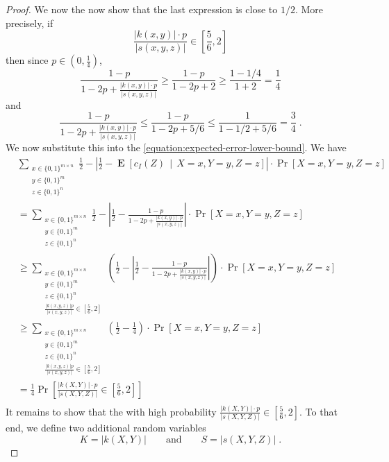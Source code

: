 \documentclass[10pt]{article}
\DeclareMathOperator{\Exp}{\mathbf{E}}
\begin{document}
\begin{proof}
We now the now show that the last expression is close to $1/2$. More precisely, if
\begin{equation}
\frac{|k(x,y)| \cdot p}{|s(x,y,z)|} \in \left[\frac{5}{6}, 2 \right]
\end{equation}
then since $p \in (0,\frac{1}{4})$,
$$
\frac{\displaystyle 1 - p}{\displaystyle 1 - 2p + \frac{|k(x,y)| \cdot p}{|s(x,y,z)|}} \ge
\frac{\displaystyle 1 - p}{\displaystyle 1 - 2p + 2} \ge \frac{\displaystyle 1 - 1/4}{\displaystyle 1 + 2} = \frac{1}{4}
$$
and
$$
\frac{\displaystyle 1 - p}{\displaystyle 1 - 2p + \frac{|k(x,y)| \cdot p}{|s(x,y,z)|}} \le
\frac{\displaystyle 1 - p}{\displaystyle 1 - 2p + 5/6} \le \frac{\displaystyle 1}{\displaystyle 1 - 1/2 + 5/6} = \frac{3}{4} \; .
$$
We now substitute this into the \eqref{equation:expected-error-lower-bound}. We have
\begin{align*}
& \sum_{\substack{x \in \{0,1\}^{m \times n} \\ y \in \{0,1\}^m \\ z \in \{0,1\}^n}} \frac{1}{2} - \left| \frac{1}{2} - \Exp\left[ c_I(Z) \, \middle| \, X = x, Y = y, Z = z \right] \right| \cdot \Pr \left[X = x, Y = y, Z = z \right] \\
& = \sum_{\substack{x \in \{0,1\}^{m \times n} \\ y \in \{0,1\}^m \\ z \in \{0,1\}^n}} \frac{1}{2} - \left| \frac{1}{2} - \frac{\displaystyle 1 - p}{\displaystyle 1 - 2p + \frac{|k(x,y)| \cdot p}{|s(x,y,z)|}} \right| \cdot \Pr \left[X = x, Y = y, Z = z \right] \\
& \ge
\sum_{\substack{x \in \{0,1\}^{m \times n} \\ y \in \{0,1\}^m \\ z \in \{0,1\}^n \\ \frac{|k(x,y,z)| p}{|s(x,y,z)|} \in [\frac{5}{6},2]}} \left( \frac{1}{2} - \left| \frac{1}{2} - \frac{\displaystyle 1 - p}{\displaystyle 1 - 2p + \frac{|k(x,y)| \cdot p}{|s(x,y,z)|}} \right|  \right) \cdot \Pr \left[X = x, Y = y, Z = z \right] \\
& \ge
\sum_{\substack{x \in \{0,1\}^{m \times n} \\ y \in \{0,1\}^m \\ z \in \{0,1\}^n \\ \frac{|k(x,y,z)| p}{|s(x,y,z)|} \in [\frac{5}{6},2]}} \left( \frac{1}{2} - \frac{1}{4} \right) \cdot \Pr \left[X = x, Y = y, Z = z \right] \\
& =
\frac{1}{4} \Pr \left[ \frac{|k(X,Y)| \cdot p}{|s(X,Y,Z)|} \in \left[\frac{5}{6}, 2 \right]  \right] \\
\end{align*}
It remains to show that the with high probability $\frac{|k(X,Y)| \cdot p}{|s(X,Y,Z)|} \in \left[\frac{5}{6}, 2 \right]$.
To that end, we define two additional random variables
$$
K = |k(X,Y)| \qquad \text{and} \qquad S = |s(X,Y,Z)| \; .
$$


\end{proof}
\end{document}
